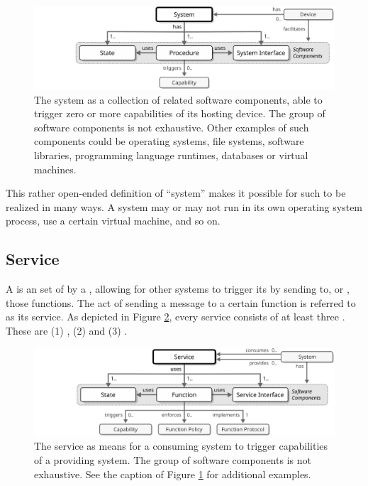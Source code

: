 \begin{figure}[ht!]
  \centering
  \includegraphics[scale=0.9]{figures/system}
  \caption{
    The system as a collection of related software components, able to trigger zero or more capabilities of its hosting device.
    The group of software components is not exhaustive.
    Other examples of such components could be operating systems, file systems, software libraries, programming language runtimes, databases or virtual machines.
  }
  \label{fig:system}
\end{figure}

This rather open-ended definition of ``system'' makes it possible for such to be realized in many ways.
A system may or may not run in its own operating system process, use a certain virtual machine, and so on.

\subsection{Service}
\label{sec:reference-model:service}

A  is an  set of   by a , allowing for other systems to trigger its  by sending  to, or , those functions.
The act of sending a message to a certain function is referred to as  its service.
As depicted in Figure \ref{fig:service}, every service consists of at least three .
These are (1) , (2)  and (3) .

\begin{figure}[ht!]
  \centering
  \includegraphics[scale=0.9]{figures/service}
  \caption{
    The service as means for a consuming system to trigger capabilities of a providing system.
    The group of software components is not exhaustive.
    See the caption of Figure \ref{fig:system} for additional examples.
  }
  \label{fig:service}
\end{figure}

